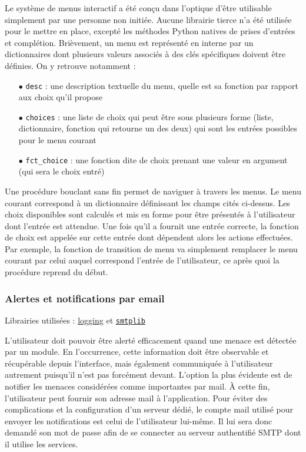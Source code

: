 \documentclass[]{article}
\begin{document}
Le système de menus interactif a été conçu dans l'optique d'être utilisable simplement par une personne non initiée. Aucune librairie tierce n'a été utilisée pour le mettre en place, excepté les méthodes Python natives de prises d'entrées et complétion. Brièvement, un menu est représenté en interne par un dictionnaires dont plusieurs valeurs associés à des clés spécifiques doivent être définies. On y retrouve notamment :\\
\begin{itemize}
\item[$\bullet$] \texttt{desc} : une description textuelle du menu, quelle est sa fonction par rapport aux choix qu'il propose
\vspace{0.1cm}
\item[$\bullet$] \texttt{choices} : une liste de choix qui peut être sous plusieurs forme (liste, dictionnaire, fonction qui retourne un des deux) qui sont les entrées possibles pour le menu courant
\vspace{0.1cm}
\item[$\bullet$] \texttt{fct\_choice} : une fonction dite de choix prenant une valeur en argument (qui sera le choix entré)
\end{itemize}
\vspace{0.2cm}

Une procédure bouclant sans fin permet de naviguer à travers les menus. Le menu courant correspond à un dictionnaire définissant les champs cités ci-dessus. Les choix disponibles sont calculés et mis en forme pour être présentés à l'utilisateur dont l'entrée est attendue. Une fois qu'il a fournit une entrée correcte, la fonction de choix est appelée sur cette entrée dont dépendent alors les actions effectuées. Par exemple, la fonction de transition de menu va simplement remplacer le menu courant par celui auquel correspond l'entrée de l'utilisateur, ce après quoi la procédure reprend du début.

\subsubsection{Alertes et notifications par email}

\noindent Librairies utilisées : \href{https://docs.python.org/3/howto/logging.html}{logging} et \href{https://docs.python.org/3/library/smtplib.html}{\texttt{smtplib}}

\par L'utilisateur doit pouvoir être alerté efficacement quand une menace est détectée par un module. En l'occurrence, cette information doit être observable et récupérable depuis l'interface, mais également communiquée à l'utilisateur autrement puisqu'il n'est pas forcément devant. L'option la plus évidente est de notifier les menaces considérées comme importantes par mail. À cette fin, l'utilisateur peut fournir son adresse mail à l'application. Pour éviter des complications et la configuration d'un serveur dédié, le compte mail utilisé pour envoyer les notifications est celui de l'utilisateur lui-même. Il lui sera donc demandé son mot de passe afin de se connecter au serveur authentifié SMTP dont il utilise les services.\\
\end{document}
